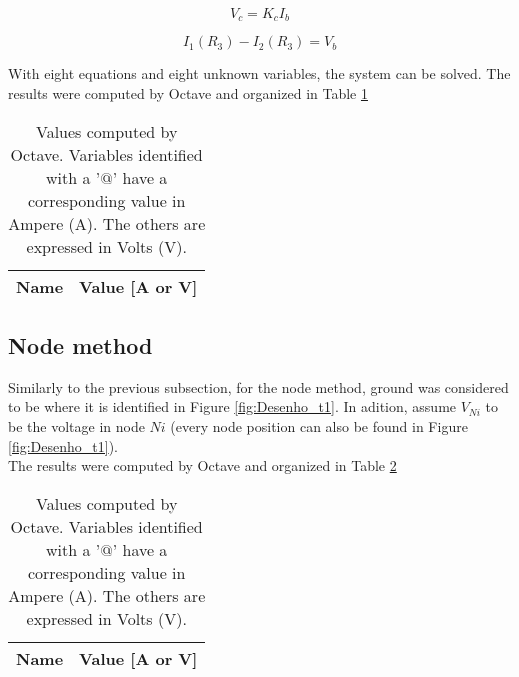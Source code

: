 \begin{equation}
	V_c = K_cI_b
	\label{eq:depsrc2}
\end{equation}

\begin{equation}
	I_1(R_3)-I_2(R_3) = V_b
	\label{eq:rel_ohm1}
\end{equation}

With eight equations and eight unknown variables, the system can be solved.
The results were computed by Octave and organized in Table \ref{tab:mesh}

\begin{table}[h]
	\centering
	\begin{tabular}{|l|r|}
    		\hline    
    		{\bf Name} & {\bf Value [A or V]} \\ \hline
    		
  	\end{tabular}
  	\caption{Values computed by Octave. Variables identified with a '$@$' have a
  	corresponding value in Ampere (A). The others are expressed in Volts (V).}
 
\label{tab:mesh}
\end{table}




\subsection{Node method}
\label{subsec:node_met}


Similarly to the previous subsection, for the node method, ground was considered to be where it is identified in
Figure \ref{fig:Desenho_t1}. In adition, assume $V_{Ni}$ to be the voltage in node $Ni$ (every node position can
also be found in Figure \ref{fig:Desenho_t1}). \\



The results were computed by Octave and organized in Table \ref{tab:node}

\begin{table}[h]
	\centering
	\begin{tabular}{|l|r|}
    		\hline    
    		{\bf Name} & {\bf Value [A or V]} \\ \hline
    		
  	\end{tabular}
  	\caption{Values computed by Octave. Variables identified with a '$@$' have a
  	corresponding value in Ampere (A). The others are expressed in Volts (V).}
 
\label{tab:node}
\end{table}


